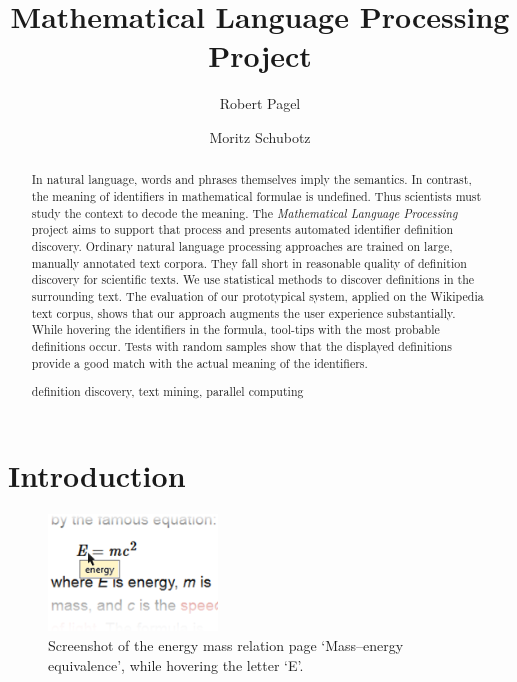 \documentclass[runningheads]{llncs}
\newcommand{\keywords}[1]{\par\addvspace\baselineskip
\noindent\keywordname\enspace\ignorespaces#1}
\begin{document}
\mainmatter

\title{Mathematical Language Processing \\ Project}

\author{Robert Pagel \and Moritz Schubotz}



\maketitle


\begin{abstract}

In natural language, words and phrases themselves imply the semantics. In
contrast, the meaning of identifiers in mathematical formulae is undefined.
Thus scientists must study the context to decode the meaning. The
\emph{Mathematical Language Processing} project aims to support that process
and presents automated identifier definition discovery. Ordinary natural
language processing approaches are trained on large, manually annotated text
corpora. They fall short in reasonable quality of definition discovery for
scientific texts. We use statistical methods to discover definitions in the
surrounding text. The evaluation of our prototypical system, applied on the
Wikipedia text corpus, shows that our approach augments the user experience
substantially. While hovering the identifiers in the formula, tool-tips with
the most probable definitions occur. Tests with random samples show that the
displayed definitions provide a good match with the actual meaning of the
identifiers.

\keywords{definition discovery, text mining, parallel computing}
\end{abstract}


\section{Introduction}

\begin{figure}
  \label{fig:screenshot}
  \vspace{-20pt}
  \includegraphics[width=0.4\textwidth]{screenshot}
  \caption{Screenshot of the energy mass relation page `Mass–energy equivalence', while hovering the letter `E'.}
  \vspace{-20pt}
\end{figure}
\end{document}
